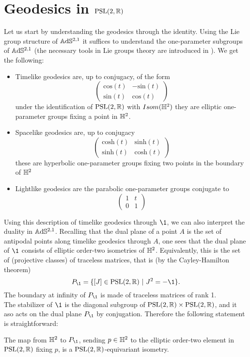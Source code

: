 \section{Geodesics in $\text{PSL}(2,\mathbb{R})$}
Let us start by understanding the geodesics through the identity. Using the Lie group structure of $\mathbb{A}\mathrm{d}\mathbb{S}^{2,1}$ it suffices to understand the one-parameter subgroups of $\mathbb{A}\mathrm{d}\mathbb{S}^{2,1}$
(the necessary tools in Lie groups theory are introduced in \cite{bonsanteseppi}). We get the following:
\begin{itemize}
    \item Timelike geodesics are, up to conjugacy, of the form
    \[ \begin{pmatrix}
        \text{cos}(t) & -\text{sin}(t) \\
        \text{sin}(t) & \text{cos}(t)
    \end{pmatrix} \]
    under the identification of $\text{PSL}(2,\mathbb{R})$ with $Isom(\mathbb{H}^2)$ they are elliptic one-parameter groups fixing a point in $\mathbb{H}^2$.
    \item Spacelike geodesics are, up to conjugacy
    \[ \begin{pmatrix}
        \text{cosh}(t) & \text{sinh}(t) \\
        \text{sinh}(t) & \text{cosh}(t)
    \end{pmatrix} \]
    these are hyperbolic one-parameter groups fixing two points in the boundary of $\mathbb{H}^2$
    \item Lightlike geodesics are the parabolic one-parameter groups conjugate to
    \[ \begin{pmatrix}
        1 & t \\
        0 & 1
    \end{pmatrix} \]
\end{itemize}
Using this description of timelike geodesics through $\1$, we can also interpret the duality in $\mathbb{A}\mathrm{d}\mathbb{S}^{2,1}$. Recalling that the dual plane of a point $A$ is the set of antipodal points along timelike geodesics through $A$, one sees that the dual plane of $\1$ consists of elliptic order-two isometries of $\mathbb{H}^2$. Equivalently, this is the set of (projective classes) of traceless matrices, that is (by the Cayley-Hamilton theorem)
\[
    P_\1 = \{ [J]\in\PSL \ | \ J^2 = -\1 \}.
\]
The boundary at infinity of $P_\1$ is made of traceless matrices of rank 1.\\
The stabilizer of $\1$ is the diagonal subgroup of $\text{PSL}(2,\mathbb{R}) \times \text{PSL}(2,\mathbb{R})$, and it aso acts on the dual plane $P_\1$ by conjugation. Therefore the following statement is straightforward:
\begin{lemma}\label{lem:dual plane}
    The map from $\mathbb{H}^2$ to $P_\1$, sending $p\in\mathbb{H}^2$ to the elliptic order-two element in $\text{PSL}(2,\mathbb{R})$ fixing $p$, is a $\text{PSL}(2,\mathbb{R})$-equivariant isometry.
\end{lemma}

